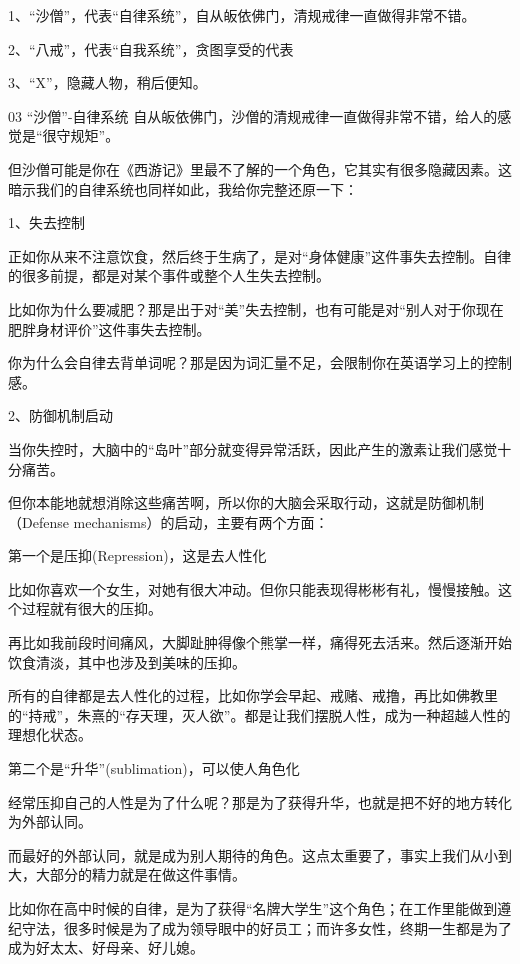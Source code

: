 \documentclass{cugrep}
\begin{document}
1、“沙僧”，代表“自律系统”，自从皈依佛门，清规戒律一直做得非常不错。

2、“八戒”，代表“自我系统”，贪图享受的代表

3、“X”，隐藏人物，稍后便知。



03 “沙僧”-自律系统
自从皈依佛门，沙僧的清规戒律一直做得非常不错，给人的感觉是“很守规矩”。

但沙僧可能是你在《西游记》里最不了解的一个角色，它其实有很多隐藏因素。这暗示我们的自律系统也同样如此，我给你完整还原一下：


1、失去控制

正如你从来不注意饮食，然后终于生病了，是对“身体健康”这件事失去控制。自律的很多前提，都是对某个事件或整个人生失去控制。

比如你为什么要减肥？那是出于对“美”失去控制，也有可能是对“别人对于你现在肥胖身材评价”这件事失去控制。

你为什么会自律去背单词呢？那是因为词汇量不足，会限制你在英语学习上的控制感。



2、防御机制启动

当你失控时，大脑中的“岛叶”部分就变得异常活跃，因此产生的激素让我们感觉十分痛苦。

但你本能地就想消除这些痛苦啊，所以你的大脑会采取行动，这就是防御机制（Defense mechanisms）的启动，主要有两个方面：

第一个是压抑(Repression)，这是去人性化

比如你喜欢一个女生，对她有很大冲动。但你只能表现得彬彬有礼，慢慢接触。这个过程就有很大的压抑。

再比如我前段时间痛风，大脚趾肿得像个熊掌一样，痛得死去活来。然后逐渐开始饮食清淡，其中也涉及到美味的压抑。

所有的自律都是去人性化的过程，比如你学会早起、戒赌、戒撸，再比如佛教里的“持戒”，朱熹的“存天理，灭人欲”。都是让我们摆脱人性，成为一种超越人性的理想化状态。

第二个是“升华”(sublimation)，可以使人角色化

经常压抑自己的人性是为了什么呢？那是为了获得升华，也就是把不好的地方转化为外部认同。

而最好的外部认同，就是成为别人期待的角色。这点太重要了，事实上我们从小到大，大部分的精力就是在做这件事情。

比如你在高中时候的自律，是为了获得“名牌大学生”这个角色；在工作里能做到遵纪守法，很多时候是为了成为领导眼中的好员工；而许多女性，终期一生都是为了成为好太太、好母亲、好儿媳。
\end{document}
